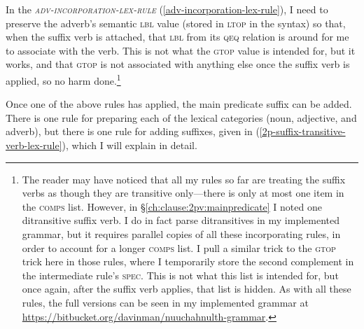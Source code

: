 In the \textsc{\textit{adv-incorporation-lex-rule}} (\ref{adv-incorporation-lex-rule}), I need to preserve the adverb's semantic \textsc{lbl} value (stored in \textsc{ltop} in the syntax) so that, when the suffix verb is attached, that \textsc{lbl} from its \textsc{qeq} relation is around for me to associate with the verb. This is not what the \textsc{gtop} value is intended for, but it works, and that \textsc{gtop} is not associated with anything else once the suffix verb is applied, so no harm done.\footnote{The reader may have noticed that all my rules so far are treating the suffix verbs as though they are transitive only---there is only at most one item in the \textsc{comps} list. However, in \S\ref{ch:clause:2pv:mainpredicate} I noted one ditransitive suffix verb. I do in fact parse ditransitives in my implemented grammar, but it requires parallel copies of all these incorporating rules, in order to account for a longer \textsc{comps} list. I pull a similar trick to the \textsc{gtop} trick here in those rules, where I temporarily store the second complement in the intermediate rule's \textsc{spec}. This is not what this list is intended for, but once again, after the suffix verb applies, that list is hidden. As with all these rules, the full versions can be seen in my implemented grammar at \url{https://bitbucket.org/davinman/nuuchahnulth-grammar}.}

Once one of the above rules has applied, the main predicate suffix can be added. There is one rule for preparing each of the lexical categories (noun, adjective, and adverb), but there is one rule for adding suffixes, given in (\ref{2p-suffix-transitive-verb-lex-rule}), which I will explain in detail.

